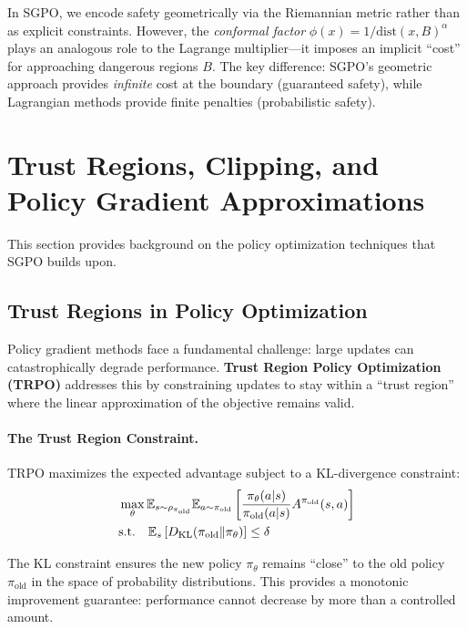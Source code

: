 \begin{remark}
In SGPO, we encode safety geometrically via the Riemannian metric rather than as explicit constraints. However, the \emph{conformal factor} $\phi(x) = 1/\text{dist}(x, B)^\alpha$ plays an analogous role to the Lagrange multiplier---it imposes an implicit ``cost'' for approaching dangerous regions $B$. The key difference: SGPO's geometric approach provides \emph{infinite} cost at the boundary (guaranteed safety), while Lagrangian methods provide finite penalties (probabilistic safety).
\end{remark}

\section{Trust Regions, Clipping, and Policy Gradient Approximations}
\label{app:ppo_cpo}

This section provides background on the policy optimization techniques that SGPO builds upon.

\subsection{Trust Regions in Policy Optimization}

Policy gradient methods face a fundamental challenge: large updates can catastrophically degrade performance. \textbf{Trust Region Policy Optimization (TRPO)} \citep{schulman2015trust} addresses this by constraining updates to stay within a ``trust region'' where the linear approximation of the objective remains valid.

\paragraph{The Trust Region Constraint.}
TRPO maximizes the expected advantage subject to a KL-divergence constraint:
\begin{align}
&\max_\theta \mathbb{E}_{s \sim \rho_{\pi_{\text{old}}}} \mathbb{E}_{a \sim \pi_{\text{old}}} \left[ \frac{\pi_\theta(a|s)}{\pi_{\text{old}}(a|s)} A^{\pi_{\text{old}}}(s,a) \right] \notag \\
&\text{s.t.} \quad \mathbb{E}_s \left[ D_{\text{KL}}(\pi_{\text{old}} \| \pi_\theta) \right] \le \delta
\end{align}

The KL constraint ensures the new policy $\pi_\theta$ remains ``close'' to the old policy $\pi_{\text{old}}$ in the space of probability distributions. This provides a monotonic improvement guarantee: performance cannot decrease by more than a controlled amount.

